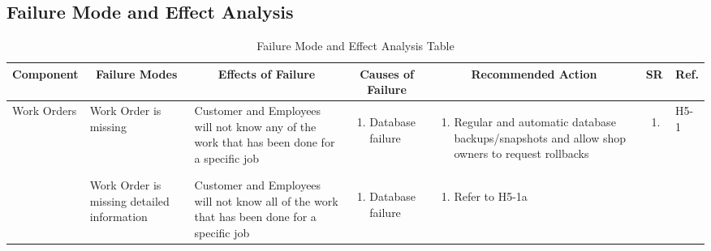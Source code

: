\documentclass{article}
\begin{document}
\newpage
\begin{landscape}
	\section{Failure Mode and Effect Analysis}
	\begin{longtable}{|p{}|p{}|p{}|p{}|p{}|p{}|p{}|}
		\caption{Failure Mode and Effect Analysis Table}                                                               \\
		\hline
		\multicolumn{1}{|c|}{\textbf{Component}}
		 & \multicolumn{1}{|c|}{\textbf{Failure Modes}}
		 & \multicolumn{1}{|c|}{\textbf{Effects of Failure}}
		 & \multicolumn{1}{|c|}{\textbf{Causes of Failure}}
		 & \multicolumn{1}{|c|}{\textbf{Recommended Action}}
		 & \multicolumn{1}{|c|}{\textbf{SR}}
		 & \multicolumn{1}{|c|}{\textbf{Ref.}}                                                                         \\
		\hline
		\multirow{2}{*}{Work Orders}
		 & Work Order is missing
		 & Customer and Employees will not know any of the work that has been done for a specific job
		 & \begin{enumerate}[label=\alph*., leftmargin=*]
			   \item Database failure
		   \end{enumerate}
		 & \begin{enumerate}[label=\alph*., leftmargin=*]
			   \item Regular and automatic database backups/snapshots and allow shop owners to request rollbacks
		   \end{enumerate}
		 & \begin{enumerate}[label=\alph*., leftmargin=*]
			   \item
		   \end{enumerate}
		 & H5-1                                                                                                        \\
		\cline{2-7}
		~
		 & Work Order is missing detailed information
		 & Customer and Employees will not know all of the work that has been done for a specific job
		 & \begin{enumerate}[label=\alph*., leftmargin=*]
			   \item Database failure
		   \end{enumerate}
		 & \begin{enumerate}[label=\alph*., leftmargin=*]
			   \item Refer to H5-1a

\end{enumerate}
\end{longtable}
\end{landscape}
\end{document}
